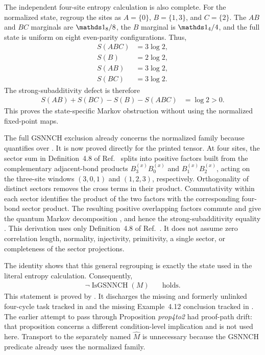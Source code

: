 \documentclass{article}
\begin{document}
The independent four-site entropy calculation is also complete. For the
normalized state, regroup the sites as $A=\{0\}$, $B=\{1,3\}$, and
$C=\{2\}$. The $AB$ and $BC$ marginals are $\Id_8/8$, the $B$ marginal is
$\Id_4/4$, and the full state is uniform on eight even-parity configurations.
Thus,
\begin{align}
    S(ABC)
        &= 3\log 2,
    \label{eq:cpsv412_entropy_abc}\\
    S(B)
        &= 2\log 2,
    \label{eq:cpsv412_entropy_b}\\
    S(AB)
        &= 3\log 2,
    \label{eq:cpsv412_entropy_ab}\\
    S(BC)
        &= 3\log 2.
    \label{eq:cpsv412_entropy_bc}
\end{align}
The strong-subadditivity defect is therefore
\begin{align}
    S(AB)+S(BC)-S(B)-S(ABC)
        &= \log 2
         > 0.
    \label{eq:cpsv412_strong_subadditivity_defect}
\end{align}
This proves the state-specific Markov obstruction without using the normalized
fixed-point maps.

The full GSNNCH exclusion already concerns the normalized family because
 quantifies over
. It is now proved directly for the printed
tensor. At four sites, the sector sum in Definition~4.8 of
Ref.~\cite{Cirac2016MPDO_arXiv} splits into positive factors built from the
complementary adjacent-bond products $B_3^{(x)}B_0^{(x)}$ and
$B_1^{(x)}B_2^{(x)}$, acting on the three-site windows $(3,0,1)$ and
$(1,2,3)$, respectively. Orthogonality of distinct sectors removes the cross
terms in their product. Commutativity within each sector identifies the
product of the two factors with the corresponding four-bond sector product.
The resulting positive overlapping factors commute and give the quantum
Markov decomposition
,
and hence the strong-subadditivity equality
. This derivation uses
only Definition~4.8 of Ref.~\cite{Cirac2016MPDO_arXiv}. It does not assume
zero correlation length, normality, injectivity, primitivity, a single sector,
or completeness of the sector projections.

The identity
shows that this general regrouping is exactly the state used in the literal
entropy calculation. Consequently,
\begin{align}
    \neg\operatorname{IsGSNNCH}(M)
        &\quad\text{holds}.
    \label{eq:cpsv412_literal_not_gsnnch}
\end{align}
This statement is proved by
. It discharges the
missing and formerly unlinked four-cycle task tracked in  and
the missing Example~4.12 conclusion tracked in . The earlier
attempt to pass through Proposition \emph{prop4to2} had proof-path drift:
that proposition concerns a different condition-level implication and is not
used here. Transport to the separately named $\widehat M$ is unnecessary
because the GSNNCH predicate already uses the normalized family.
\end{document}
